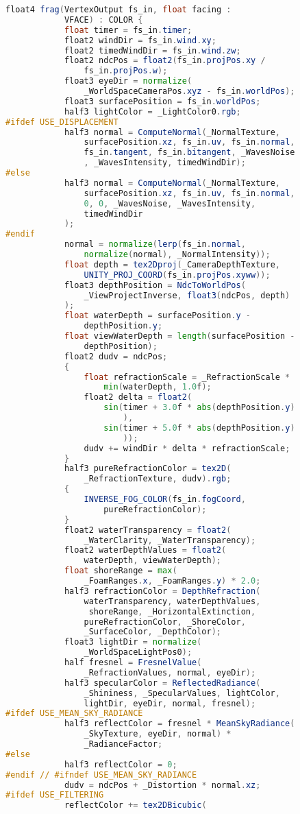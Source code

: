 \begin{lstlisting}[language=GLSL, caption={\label{cf:agua} Shader de efeito de água na Unity}]
		float4 frag(VertexOutput fs_in, float facing : 
			VFACE) : COLOR {
			float timer = fs_in.timer;
			float2 windDir = fs_in.wind.xy;
			float2 timedWindDir = fs_in.wind.zw;
			float2 ndcPos = float2(fs_in.projPos.xy / 
				fs_in.projPos.w);
			float3 eyeDir = normalize(
				_WorldSpaceCameraPos.xyz - fs_in.worldPos);
			float3 surfacePosition = fs_in.worldPos;
			half3 lightColor = _LightColor0.rgb;
#ifdef USE_DISPLACEMENT
			half3 normal = ComputeNormal(_NormalTexture, 
				surfacePosition.xz, fs_in.uv, fs_in.normal, 
				fs_in.tangent, fs_in.bitangent, _WavesNoise
				, _WavesIntensity, timedWindDir);
#else
			half3 normal = ComputeNormal(_NormalTexture, 
				surfacePosition.xz, fs_in.uv, fs_in.normal, 
				0, 0, _WavesNoise, _WavesIntensity, 
				timedWindDir
			);
#endif
			normal = normalize(lerp(fs_in.normal, 
				normalize(normal), _NormalIntensity));
			float depth = tex2Dproj(_CameraDepthTexture, 
				UNITY_PROJ_COORD(fs_in.projPos.xyww));
			float3 depthPosition = NdcToWorldPos(
				_ViewProjectInverse, float3(ndcPos, depth)
			);
			float waterDepth = surfacePosition.y - 
				depthPosition.y; 
			float viewWaterDepth = length(surfacePosition - 
				depthPosition); 
			float2 dudv = ndcPos;
			{
				float refractionScale = _RefractionScale * 
					min(waterDepth, 1.0f);
				float2 delta = float2(
					sin(timer + 3.0f * abs(depthPosition.y)
						),
					sin(timer + 5.0f * abs(depthPosition.y)
						));
				dudv += windDir * delta * refractionScale;
			}
			half3 pureRefractionColor = tex2D(
				_RefractionTexture, dudv).rgb;
			{
				INVERSE_FOG_COLOR(fs_in.fogCoord, 
					pureRefractionColor);
			}
			float2 waterTransparency = float2(
				_WaterClarity, _WaterTransparency);
			float2 waterDepthValues = float2(
				waterDepth, viewWaterDepth);
			float shoreRange = max(
				_FoamRanges.x, _FoamRanges.y) * 2.0;
			half3 refractionColor = DepthRefraction(
				waterTransparency, waterDepthValues, 
				 shoreRange, _HorizontalExtinction,
				pureRefractionColor, _ShoreColor, 
				_SurfaceColor, _DepthColor);
			float3 lightDir = normalize(
				_WorldSpaceLightPos0);
			half fresnel = FresnelValue(
				_RefractionValues, normal, eyeDir);
			half3 specularColor = ReflectedRadiance(
				_Shininess, _SpecularValues, lightColor, 
				lightDir, eyeDir, normal, fresnel);
#ifdef USE_MEAN_SKY_RADIANCE
			half3 reflectColor = fresnel * MeanSkyRadiance(
				_SkyTexture, eyeDir, normal) * 
				_RadianceFactor;
#else
			half3 reflectColor = 0;
#endif // #ifndef USE_MEAN_SKY_RADIANCE
			dudv = ndcPos + _Distortion * normal.xz;
#ifdef USE_FILTERING
			reflectColor += tex2DBicubic(

\end{lstlisting}
